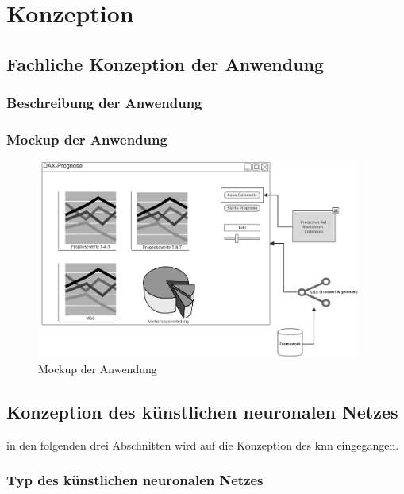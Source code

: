 \chapter{Konzeption}
\label{chapter:Konzeption}

\section{Fachliche Konzeption der Anwendung} 
\label{section:Fachliche Konzeption der Anwendung}

\subsection{Beschreibung der Anwendung}
\label{subsection:Beschreibung der Anwendung}

\subsection{Mockup der Anwendung}
\label{subsection:Mockup der Anwendung}

\begin{figure}[htbp]
\centering
		\includegraphics[width=0.95\textwidth]{mockup.PNG}
	\caption{Mockup der Anwendung}
	\label{fig:Mockup der Anwendung}
\end{figure}

\section{Konzeption des künstlichen neuronalen Netzes}
\label{section:Konzeption des künstlichen neuronalen Netzes}

in den folgenden drei Abschnitten wird auf die Konzeption des \ac{knn} eingegangen.
\subsection{Typ des künstlichen neuronalen Netzes}
\label{subsection:Typ des künstlichen neuronalen Netzes}

